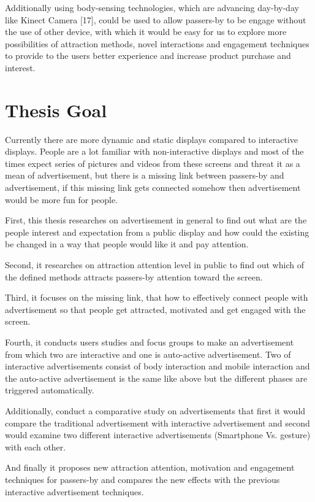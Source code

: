 Additionally using body-sensing technologies, which are advancing day-by-day like Kinect Camera [17], could be used to allow passers-by to be engage without the use of other device, with which it would be easy for us to explore more possibilities of attraction methods, novel interactions and engagement techniques to provide to the users better experience and increase product purchase and interest.

\section{Thesis Goal}

Currently there are more dynamic and static displays compared to interactive displays. People are a lot familiar with non-interactive displays and most of the times expect series of pictures and videos from these screens and threat it as a mean of advertisement, but there is a missing link between passers-by and advertisement, if this missing link gets connected somehow then advertisement would be more fun for people. 

First, this thesis researches on advertisement in general to find out what are the people interest and expectation from a public display and how could the existing be changed in a way that people would like it and pay attention.

Second, it researches on attraction attention level in public to find out which of the defined methods attracts passers-by attention toward the screen.

Third, it focuses on the missing link, that how to effectively connect people with advertisement so that people get attracted, motivated and get engaged with the screen.

Fourth, it conducts users studies and focus groups to make an advertisement from which two are interactive and one is auto-active advertisement. Two of interactive advertisements consist of body interaction and mobile interaction and the auto-active advertisement is the same like above  but the different phases are triggered automatically. 

Additionally, conduct a comparative study on advertisements that first it would compare the traditional advertisement with interactive advertisement and second would examine two different interactive advertisements (Smartphone Vs. gesture) with each other.


And finally it proposes new attraction attention, motivation and engagement techniques for passers-by and compares the new effects with the previous interactive advertisement techniques.

